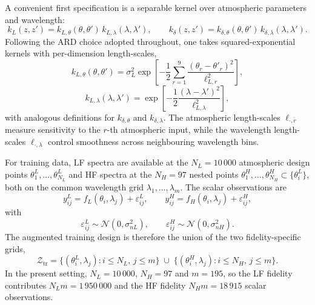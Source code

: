 \documentclass[11pt,a4paper]{article}
\begin{document}
A convenient first specification is a separable kernel over atmospheric
parameters and wavelength:
\[
    k_L(z,z')
    =
    k_{L,\theta}(\theta,\theta')\,k_{L,\lambda}(\lambda,\lambda'),
    \qquad
    k_\delta(z,z')
    =
    k_{\delta,\theta}(\theta,\theta')\,k_{\delta,\lambda}(\lambda,\lambda').
\]
Following the ARD choice adopted throughout, one takes squared-exponential kernels
with per-dimension length-scales,
\[
    k_{L,\theta}(\theta,\theta')
    =
    \sigma_L^2
    \exp\left[
    -\frac12
    \sum_{r=1}^{9}
    \frac{(\theta_r-\theta'_r)^2}{\ell_{L,r}^2}
    \right],
\]
\[
    k_{L,\lambda}(\lambda,\lambda')
    =
    \exp\left[
    -\frac12
    \frac{(\lambda-\lambda')^2}{\ell_{L,\lambda}^2}
    \right],
\]
with analogous definitions for \(k_{\delta,\theta}\) and
\(k_{\delta,\lambda}\). The atmospheric length-scales
\(\ell_{\cdot,r}\) measure sensitivity to the \(r\)-th atmospheric input,
while the wavelength length-scales \(\ell_{\cdot,\lambda}\) control
smoothness across neighbouring wavelength bins.

For training data, LF spectra are available at the \(N_L=10\,000\)
atmospheric design points \(\theta^{L}_1,\ldots,\theta^{L}_{N_L}\) and HF spectra
at the \(N_H=97\) nested points \(\theta^{H}_1,\ldots,\theta^{H}_{N_H}\subset\{\theta^{L}_i\}\),
both on the common wavelength grid \(\lambda_1,\ldots,\lambda_m\). The scalar observations are
\[
    y^L_{ij}
    =
    f_L(\theta_i,\lambda_j)
    +
    \varepsilon^L_{ij},
    \qquad
    y^H_{ij}
    =
    f_H(\theta_i,\lambda_j)
    +
    \varepsilon^H_{ij},
\]
with
\[
    \varepsilon^L_{ij}\sim\mathcal N(0,\sigma^2_{nL}),
    \qquad
    \varepsilon^H_{ij}\sim\mathcal N(0,\sigma^2_{nH}).
\]
The augmented training design is therefore the union of the two
fidelity-specific grids,
\[
    \mathcal Z_{\mathrm{tr}}
    =
    \bigl\{(\theta^{L}_i,\lambda_j):i\le N_L,\,j\le m\bigr\}
    \;\cup\;
    \bigl\{(\theta^{H}_i,\lambda_j):i\le N_H,\,j\le m\bigr\}.
\]
In the present setting, \(N_L=10\,000\), \(N_H=97\) and \(m=195\), so the LF
fidelity contributes \(N_L m=1\,950\,000\) and the HF fidelity
\(N_H m=18\,915\) scalar observations.
\end{document}
